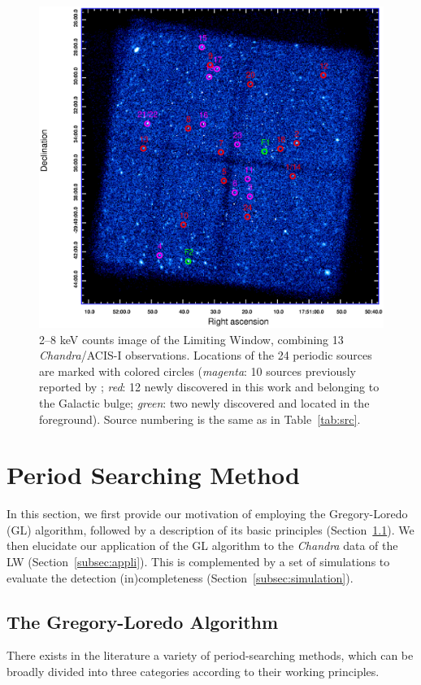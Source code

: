 \documentclass[twoside,twocolumn]{aastex63}
\begin{document}
\begin{figure}[htbp]
\centering
\includegraphics[scale=0.8]{./figure/LW/all_pCVf.eps}
\caption{2--8 keV counts image of the Limiting Window, combining 13 {\it Chandra}/ACIS-I observations. Locations of the 24 periodic sources are marked with colored circles ({\it magenta}: 10 sources previously reported by \cite{2012ApJ...746..165H}; {\it red}: 12 newly discovered in this work and belonging to the Galactic bulge; {\it green}: two newly discovered and located in the foreground). Source numbering is the same as in Table~\ref{tab:src}.}
\label{fig:FoV}
\end{figure}

\section{Period Searching Method}\label{sec:methods}
In this section, we first provide our motivation of employing the Gregory-Loredo (GL) algorithm, followed by a description of its basic principles (Section~\ref{subsec:GL}). We then elucidate our application of the GL algorithm to the {\it Chandra} data of the LW (Section~\ref{subsec:appli}). This is complemented by a set of simulations to evaluate the detection (in)completeness (Section~\ref{subsec:simulation}).  

\subsection{The Gregory-Loredo Algorithm} \label{subsec:GL}
There exists in the literature a variety of period-searching methods, which can be broadly divided into three categories according to their working principles. 
\end{document}
